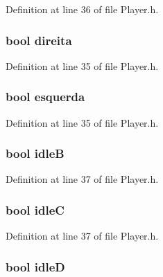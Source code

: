 Definition at line 36 of file Player.\-h.

\hypertarget{struct_state_a53d4a67dd6be122bb796d09f318b6ce7}{
\subsubsection[{direita}]{\setlength{\rightskip}{0pt plus 5cm}bool direita}}\label{struct_state_a53d4a67dd6be122bb796d09f318b6ce7}


Definition at line 35 of file Player.\-h.

\hypertarget{struct_state_a28653e1423da75a038905c2790b190cc}{
\subsubsection[{esquerda}]{\setlength{\rightskip}{0pt plus 5cm}bool esquerda}}\label{struct_state_a28653e1423da75a038905c2790b190cc}


Definition at line 35 of file Player.\-h.

\hypertarget{struct_state_a378d1ba542bfcaf5e3a389d49aeef4f3}{
\subsubsection[{idle\-B}]{\setlength{\rightskip}{0pt plus 5cm}bool idle\-B}}\label{struct_state_a378d1ba542bfcaf5e3a389d49aeef4f3}


Definition at line 37 of file Player.\-h.

\hypertarget{struct_state_a8ac061efd18c70b659f400162c88b57d}{
\subsubsection[{idle\-C}]{\setlength{\rightskip}{0pt plus 5cm}bool idle\-C}}\label{struct_state_a8ac061efd18c70b659f400162c88b57d}


Definition at line 37 of file Player.\-h.

\hypertarget{struct_state_a6e5746683faab531c01dfef6305bc44c}{
\subsubsection[{idle\-D}]{\setlength{\rightskip}{0pt plus 5cm}bool idle\-D}}\label{struct_state_a6e5746683faab531c01dfef6305bc44c}


